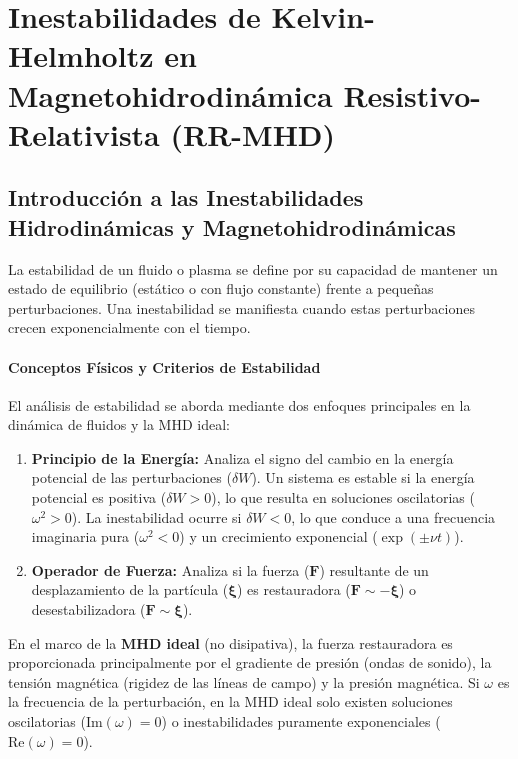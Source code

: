 
\section{Inestabilidades de Kelvin-Helmholtz en Magnetohidrodinámica Resistivo-Relativista (RR-MHD)}

\subsection{Introducción a las Inestabilidades Hidrodinámicas y Magnetohidrodinámicas}

La estabilidad de un fluido o plasma se define por su capacidad de mantener un estado de equilibrio (estático o con flujo constante) frente a pequeñas perturbaciones. Una inestabilidad se manifiesta cuando estas perturbaciones crecen exponencialmente con el tiempo.

\paragraph{Conceptos Físicos y Criterios de Estabilidad}
El análisis de estabilidad se aborda mediante dos enfoques principales en la dinámica de fluidos y la MHD ideal:

\begin{enumerate}
    \item \textbf{Principio de la Energía:} Analiza el signo del cambio en la energía potencial de las perturbaciones ($\delta W$). Un sistema es estable si la energía potencial es positiva ($\delta W > 0$), lo que resulta en soluciones oscilatorias ($\omega^2 > 0$). La inestabilidad ocurre si $\delta W < 0$, lo que conduce a una frecuencia imaginaria pura ($\omega^2 < 0$) y un crecimiento exponencial ($\exp(\pm \nu t)$).
    \item \textbf{Operador de Fuerza:} Analiza si la fuerza ($\mathbf{F}$) resultante de un desplazamiento de la partícula ($\boldsymbol{\xi}$) es restauradora ($\mathbf{F} \sim -\boldsymbol{\xi}$) o desestabilizadora ($\mathbf{F} \sim \boldsymbol{\xi}$).
\end{enumerate}

En el marco de la \textbf{MHD ideal} (no disipativa), la fuerza restauradora es proporcionada principalmente por el gradiente de presión (ondas de sonido), la tensión magnética (rigidez de las líneas de campo) y la presión magnética. Si $\omega$ es la frecuencia de la perturbación, en la MHD ideal solo existen soluciones oscilatorias ($\text{Im}(\omega)=0$) o inestabilidades puramente exponenciales ($\text{Re}(\omega)=0$).


